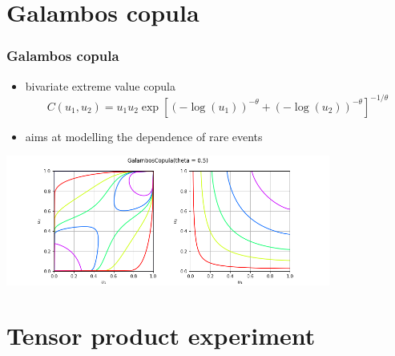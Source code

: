 \documentclass[aspectratio=169]{beamer}
\begin{document}
\section{Galambos copula}


\begin{frame}
\frametitle{Galambos copula}

\begin{itemize}
\item bivariate extreme value copula
$$ C(u_1, u_2) = u_1u_2\exp\left[(-\log(u_1))^{-\theta} + (-\log(u_2))^{-\theta}\right]^{-1/\theta} $$
\item aims at modelling the dependence of rare events
\end{itemize}

\begin{center}
\includegraphics[width=0.8\textwidth]{figures/openturns-GalambosCopula-1.png}
\end{center}

\end{frame}

\section{Tensor product experiment}
\end{document}

